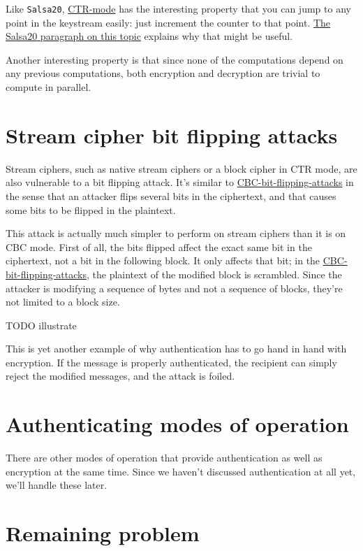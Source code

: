 \documentclass[11pt,ebook,table,dvipsnames]{memoir}
\begin{document}
Like \texttt{Salsa20}, \hyperref[CTR mode]{CTR-mode} has the interesting property that you can jump
to any point in the keystream easily: just increment the counter to
that point. \hyperref[keystream-jump]{The Salsa20 paragraph on this topic} explains why that
might be useful.

Another interesting property is that since none of the computations
depend on any previous computations, both encryption and decryption
are trivial to compute in parallel.
\section{Stream cipher bit flipping attacks}
\label{sec-2-3-15}

Stream ciphers, such as native stream ciphers or a block cipher in
\gls{CTR mode}, are also vulnerable to a bit flipping attack. It's
similar to \hyperref[CBC bit flipping attacks]{CBC-bit-flipping-attacks} in the sense that an attacker
flips several bits in the ciphertext, and that causes some bits to be
flipped in the plaintext.

This attack is actually much simpler to perform on stream ciphers than
it is on \gls{CBC mode}. First of all, the bits flipped affect the
exact same bit in the ciphertext, not a bit in the following block. It
only affects that bit; in the \hyperref[CBC bit flipping attacks]{CBC-bit-flipping-attacks}, the plaintext
of the modified block is scrambled. Since the attacker is modifying a
sequence of bytes and not a sequence of blocks, they're not limited to
a block size.

TODO illustrate

This is yet another example of why authentication has to go hand in
hand with encryption. If the message is properly authenticated, the
recipient can simply reject the modified messages, and the attack is
foiled.
\section{Authenticating modes of operation}
\label{sec-2-3-16}

There are other modes of operation that provide authentication as
well as encryption at the same time. Since we haven't discussed
authentication at all yet, we'll handle these later.
\section{Remaining problem}
\label{sec-2-3-17}
\end{document}
